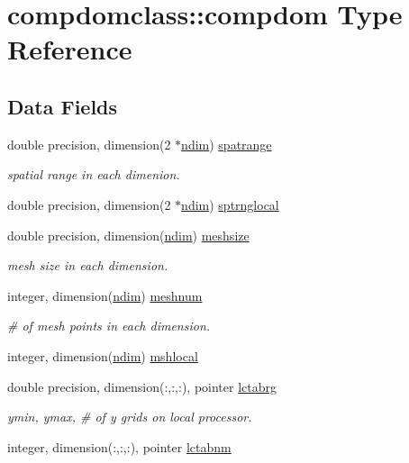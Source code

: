 \hypertarget{structcompdomclass_1_1compdom}{}\section{compdomclass\+::compdom Type Reference}
\label{structcompdomclass_1_1compdom}
\subsection*{Data Fields}
\begin{DoxyCompactItemize}
\item 
double precision, dimension(2 $\ast$\mbox{\hyperlink{namespacecompdomclass_a01f031d8af670f66db4484cd6411e99f}{ndim}}) \mbox{\hyperlink{structcompdomclass_1_1compdom_a55068267999d67699122c91b366a0682}{spatrange}}
\begin{DoxyCompactList}\small\item\em spatial range in each dimenion. \end{DoxyCompactList}\item 
double precision, dimension(2 $\ast$\mbox{\hyperlink{namespacecompdomclass_a01f031d8af670f66db4484cd6411e99f}{ndim}}) \mbox{\hyperlink{structcompdomclass_1_1compdom_a2a2654ff7dd41dbb57b11a089e568123}{sptrnglocal}}
\item 
double precision, dimension(\mbox{\hyperlink{namespacecompdomclass_a01f031d8af670f66db4484cd6411e99f}{ndim}}) \mbox{\hyperlink{structcompdomclass_1_1compdom_a13c6277e9ca60fa6a80081b2a0bc91ff}{meshsize}}
\begin{DoxyCompactList}\small\item\em mesh size in each dimension. \end{DoxyCompactList}\item 
integer, dimension(\mbox{\hyperlink{namespacecompdomclass_a01f031d8af670f66db4484cd6411e99f}{ndim}}) \mbox{\hyperlink{structcompdomclass_1_1compdom_a80b917ff817964bc120175119768f93e}{meshnum}}
\begin{DoxyCompactList}\small\item\em \# of mesh points in each dimension. \end{DoxyCompactList}\item 
integer, dimension(\mbox{\hyperlink{namespacecompdomclass_a01f031d8af670f66db4484cd6411e99f}{ndim}}) \mbox{\hyperlink{structcompdomclass_1_1compdom_a21d05738eabd33f56f26879055af6343}{mshlocal}}
\item 
double precision, dimension(\+:,\+:,\+:), pointer \mbox{\hyperlink{structcompdomclass_1_1compdom_a339ff58ad4edb52e01cf217b9a7f081c}{lctabrg}}
\begin{DoxyCompactList}\small\item\em ymin, ymax, \# of y grids on local processor. \end{DoxyCompactList}\item 
integer, dimension(\+:,\+:,\+:), pointer \mbox{\hyperlink{structcompdomclass_1_1compdom_aebcef97b10bb06dc69848b22acaffe70}{lctabnm}}
\end{DoxyCompactItemize}


